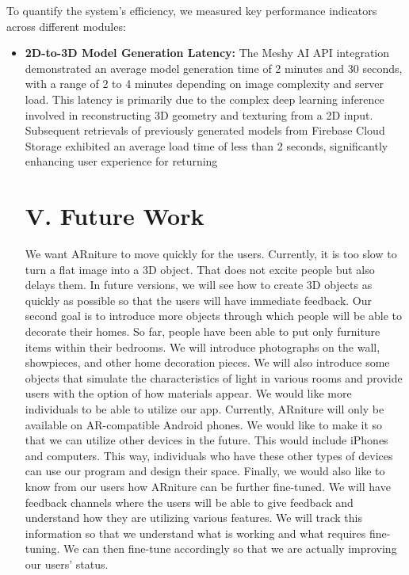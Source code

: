 \documentclass[12pt, a4paper]{article}
\begin{document}
To quantify the system's efficiency, we measured key performance indicators across different modules:

\begin{itemize}
    \item \textbf{2D-to-3D Model Generation Latency:} The Meshy AI API integration demonstrated an average model generation time of 2 minutes and 30 seconds, with a range of 2 to 4 minutes depending on image complexity and server load. This latency is primarily due to the complex deep learning inference involved in reconstructing 3D geometry and texturing from a 2D input. Subsequent retrievals of previously generated models from Firebase Cloud Storage exhibited an average load time of less than 2 seconds, significantly enhancing user experience for returning

\section{V. Future Work}
We want ARniture to move quickly for the users. Currently, it is too slow to turn a flat image into a 3D object. That does not excite people but also delays them. In future versions, we will see how to create 3D objects as quickly as possible so that the users will have immediate feedback. Our second goal is to introduce more objects through which people will be able to decorate their homes. So far, people have been able to put only furniture items within their bedrooms. We will introduce photographs on the wall, showpieces, and other home decoration pieces. We will also introduce some objects that simulate the characteristics of light in various rooms and provide users with the option of how materials appear. We would like more individuals to be able to utilize our app. Currently, ARniture will only be available on AR-compatible Android phones. We would like to make it so that we can utilize other devices in the future. This would include iPhones and computers. This way, individuals who have these other types of devices can use our program and design their space. Finally, we would also like to know from our users how ARniture can be further fine-tuned. We will have feedback channels where the users will be able to give feedback and understand how they are utilizing various features. We will track this information so that we understand what is working and what requires fine-tuning. We can then fine-tune accordingly so that we are actually improving our users' status.


\end{itemize}
\end{document}
